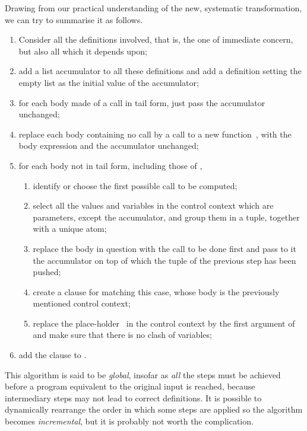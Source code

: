 Drawing from our practical understanding of the new, systematic
transformation, we can try to summarise it as follows.
\begin{enumerate}

  \item Consider all the definitions involved, that is, the one of
    immediate concern, but also all which it depends upon;

  \item add a list accumulator to all these definitions and add a
    definition setting the empty list as the initial value of the
    accumulator;

  \item for each body made of a call in tail form, just pass the
    accumulator unchanged;

  \item replace each body containing no call by a call to a new
    function~, with the body expression and the
    accumulator unchanged;

  \item for each body not in tail form, including those
    of ,
    \begin{enumerate}

      \item identify or choose the first possible call to be computed;

      \item select all the values and variables in the control context
        which are parameters, except the accumulator, and group them
        in a tuple, together with a unique atom;

      \item replace the body in question with the call to be done
        first and pass to it the accumulator on top of which the tuple
        of the previous step has been pushed;

      \item \label{add_appk1} create a clause for 
        matching this case, whose body is the previously mentioned
        control context;

      \item \label{add_appk2} replace the
        place\hyp{}holder~\erlcode{\textvisiblespace} in the control
        context by the first argument of  and make
        sure that there is no clash of variables;

    \end{enumerate}

  \item add the clause  to .

\end{enumerate}
This algorithm is said to be \emph{global}, insofar as \emph{all} the
steps must be achieved before a program equivalent to the original
input is reached, because intermediary steps may not lead to correct
definitions. It is possible to dynamically rearrange the order in
which some steps are applied so the algorithm becomes
\emph{incremental}, but it is probably not worth the complication.

